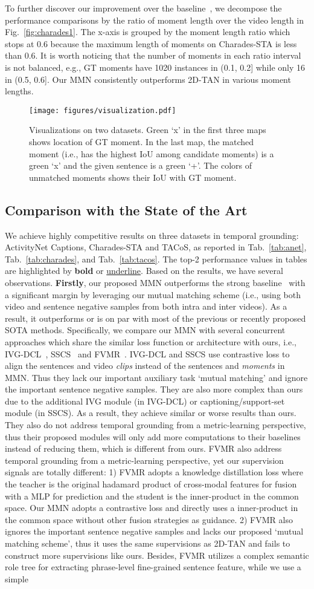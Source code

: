 \documentclass[letterpaper]{article} \usepackage{aaai22}  \usepackage{times}  \usepackage{helvet}  \usepackage{courier}  \usepackage[hyphens]{url}  \usepackage{graphicx} \urlstyle{rm} \def\UrlFont{\rm}  \usepackage{natbib}  \usepackage{caption} \DeclareCaptionStyle{ruled}{labelfont=normalfont,labelsep=colon,strut=off} \frenchspacing  \setlength{\pdfpagewidth}{8.5in}  \setlength{\pdfpageheight}{11in}  \usepackage{algorithm}
\newcommand{\figVISUAL}{
    \begin{figure*}[ht]
        \begin{center}
        \texttt{[image: figures/visualization.pdf]}
        \end{center}
        \caption{Visualizations on two datasets. Green `{\color{ao(english)}x}' in the first three maps shows location of GT moment. In the last map, the matched moment (i.e., has the highest IoU among candidate moments) is a green `{\color{ao(english)}x}' and the given sentence is a green `{\color{ao(english)}+}'. The colors of unmatched moments shows their IoU with GT moment.}
        \label{fig:visual_anet_charades}
\end{figure*}
}
\begin{document}
 To further discover our improvement over the baseline~\cite{DBLP:conf/aaai/ZhangPFL20}, we decompose the performance comparisons by the ratio of moment length over the video length in Fig.~\ref{fig:charades1}. The x-axis is grouped by the moment length ratio which stops at 0.6 because the maximum length of moments on Charades-STA is less than 0.6. It is worth noticing that the number of moments in each ratio interval is not balanced, e.g., GT moments have 1020 instances in (0.1, 0.2] while only 16 in (0.5, 0.6]. Our MMN consistently outperforms 2D-TAN in various moment lengths.
\figVISUAL
\subsection{Comparison with the State of the Art} 
We achieve highly competitive results on three datasets in temporal grounding: ActivityNet Captions, Charades-STA and TACoS, as reported in Tab.~\ref{tab:anet}, Tab.~\ref{tab:charades}, and Tab.~\ref{tab:tacos}. The top-2 performance values in tables are highlighted by {\bf bold} or \underline{ underline}. Based on the results, we have several observations. {\bf Firstly}, our proposed MMN outperforms the strong baseline~\cite{DBLP:conf/aaai/ZhangPFL20} with a significant margin by leveraging our mutual matching scheme (i.e., using both video and sentence negative samples from both intra and inter videos). As a result, it outperforms or is on par with most of the previous or recently proposed SOTA methods. Specifically, we compare our MMN with several concurrent approaches which share the similar loss function or architecture with ours, i.e., IVG-DCL~\cite{DBLP:conf/cvpr/NanQXLLZL21},  SSCS~\cite{Ding_2021_ICCV} and FVMR~\cite{Gao_2021_ICCV}. IVG-DCL and SSCS use contrastive loss to align the sentences and video {\em clips} instead of the sentences and {\em moments} in MMN. Thus they lack our important auxiliary task `mutual matching' and ignore the important sentence negative samples. They are also more complex than ours due to the additional IVG module (in IVG-DCL) or captioning/support-set module (in SSCS). As a result, they achieve similar or worse results than ours. They also do not address temporal grounding from a metric-learning perspective, thus their proposed modules will only add more computations to their baselines instead of reducing them, which is different from ours. FVMR also address temporal grounding from a metric-learning perspective, yet our supervision signals are totally different: 1) FVMR adopts a knowledge distillation loss where the teacher is the original hadamard product of cross-modal features for fusion with a MLP for prediction and the student is the inner-product in the common space. Our MMN adopts a contrastive loss and directly uses a inner-product in the common space without other fusion strategies as guidance. 2) FVMR also ignores the important sentence negative samples and lacks our proposed `mutual matching scheme', thus it uses the same supervisions as 2D-TAN and fails to construct more supervisions like ours. Besides, FVMR utilizes a complex semantic role tree for extracting phrase-level fine-grained sentence feature, while we use a simple 
\end{document}
